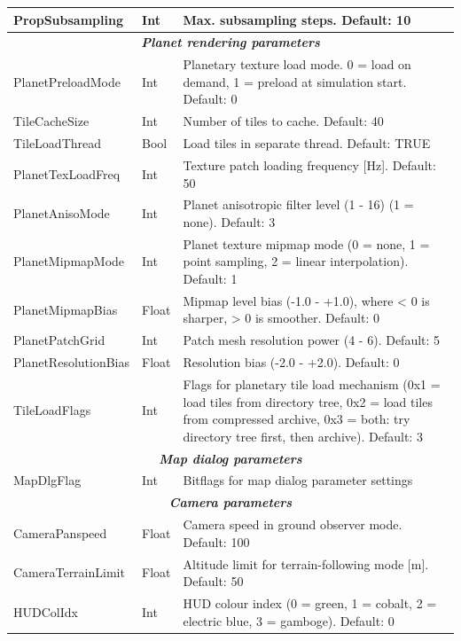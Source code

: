 \documentclass[Orbiter User Manual.tex]{subfiles}
\begin{document}
\begin{longtable}{ |p{}|p{}|p{}| }
	PropSubsampling & Int & Max. subsampling steps. Default: 10\\
	\hline
	\multicolumn{3}{|c|}{\rule{0pt}{2ex}\textbf{\textit{Planet rendering parameters}}}\\
	\hline\rule{0pt}{2ex}
	PlanetPreloadMode & Int & Planetary texture load mode. 0 = load on demand, 1 = preload at simulation start. Default: 0\\
	\hline\rule{0pt}{2ex}
	TileCacheSize & Int & Number of tiles to cache. Default: 40\\
	\hline\rule{0pt}{2ex}
	TileLoadThread & Bool & Load tiles in separate thread. Default: TRUE\\
	\hline\rule{0pt}{2ex}
	PlanetTexLoadFreq & Int & Texture patch loading frequency [Hz]. Default: 50\\
	\hline\rule{0pt}{2ex}
	PlanetAnisoMode & Int & Planet anisotropic filter level (1 - 16) (1 = none). Default: 3\\
	\hline\rule{0pt}{2ex}
	PlanetMipmapMode & Int & Planet texture mipmap mode (0 = none, 1 = point sampling, 2 = linear interpolation). Default: 1\\
	\hline\rule{0pt}{2ex}
	PlanetMipmapBias & Float & Mipmap level bias (-1.0 - +1.0), where < 0 is sharper, > 0 is smoother. Default: 0\\
	\hline\rule{0pt}{2ex}
	PlanetPatchGrid & Int & Patch mesh resolution power (4 - 6). Default: 5\\
	\hline\rule{0pt}{2ex}
	PlanetResolutionBias & Float & Resolution bias (-2.0 - +2.0). Default: 0\\
	\hline\rule{0pt}{2ex}
	TileLoadFlags & Int & Flags for planetary tile load mechanism (0x1 = load tiles from directory tree, 0x2 = load tiles from compressed archive, 0x3 = both: try directory tree first, then archive). Default: 3\\
	\hline
	\multicolumn{3}{|c|}{\rule{0pt}{2ex}\textbf{\textit{Map dialog parameters}}}\\
	\hline\rule{0pt}{2ex}
	MapDlgFlag & Int & Bitflags for map dialog parameter settings\\
	\hline
	\multicolumn{3}{|c|}{\rule{0pt}{2ex}\textbf{\textit{Camera parameters}}}\\
	\hline\rule{0pt}{2ex}
	CameraPanspeed & Float & Camera speed in ground observer mode. Default: 100\\
	\hline\rule{0pt}{2ex}
	CameraTerrainLimit & Float & Altitude limit for terrain-following mode [m]. Default: 50\\
	\hline\rule{0pt}{2ex}
	HUDColIdx & Int & HUD colour index (0 = green, 1 = cobalt, 2 = electric blue, 3 = gamboge). Default: 0\\

\end{longtable}
\end{document}
